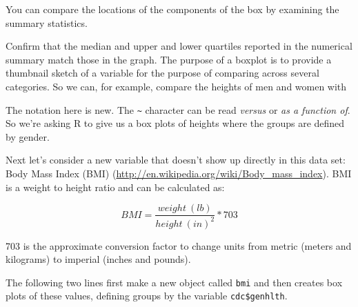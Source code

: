 \documentclass[]{book}
\newenvironment{Shaded}{\begin{snugshade}}{\end{snugshade}}
\newcommand{\KeywordTok}[1]{\textcolor[rgb]{0.13,0.29,0.53}{\textbf{{#1}}}}
\newcommand{\DecValTok}[1]{\textcolor[rgb]{0.00,0.00,0.81}{{#1}}}
\newcommand{\StringTok}[1]{\textcolor[rgb]{0.31,0.60,0.02}{{#1}}}
\newcommand{\NormalTok}[1]{{#1}}
\theoremstyle{definition}
\theoremstyle{definition}
\theoremstyle{definition}
\theoremstyle{remark}
\begin{document}
\begin{Shaded}
\end{Shaded}

You can compare the locations of the components of the box by examining
the summary statistics.

\begin{Shaded}
\end{Shaded}

Confirm that the median and upper and lower quartiles reported in the
numerical summary match those in the graph. The purpose of a boxplot is
to provide a thumbnail sketch of a variable for the purpose of comparing
across several categories. So we can, for example, compare the heights
of men and women with

\begin{Shaded}
\end{Shaded}

The notation here is new. The \texttt{\textasciitilde{}} character can
be read \emph{versus} or \emph{as a function of}. So we're asking R to
give us a box plots of heights where the groups are defined by gender.

Next let's consider a new variable that doesn't show up directly in this
data set: Body Mass Index (BMI)
(\url{http://en.wikipedia.org/wiki/Body_mass_index}). BMI is a weight to
height ratio and can be calculated as:

\[ BMI = \frac{weight~(lb)}{height~(in)^2} * 703 \]

703 is the approximate conversion factor to change units from metric
(meters and kilograms) to imperial (inches and pounds).

The following two lines first make a new object called \texttt{bmi} and
then creates box plots of these values, defining groups by the variable
\texttt{cdc\$genhlth}.

\begin{Shaded}
\end{Shaded}
\end{document}
